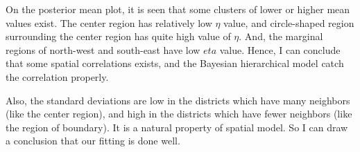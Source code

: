 \documentclass{article}
\begin{document}
On the posterior mean plot, it is seen that some clusters of lower or higher mean values exist.
The center region has relatively low $\eta$ value, and circle-shaped region surrounding the center region has quite high value of $\eta$.
And, the marginal regions of north-west and south-east have low $eta$ value.
Hence, I can conclude that some spatial correlations exists, and the Bayesian hierarchical model catch the correlation properly.

Also, the standard deviations are low in the districts which have many neighbors (like the center region), and 
high in the districts which have fewer neighbors (like the region of boundary). It is a natural property of spatial model.
So I can draw a conclusion that our fitting is done well.
\end{document}
